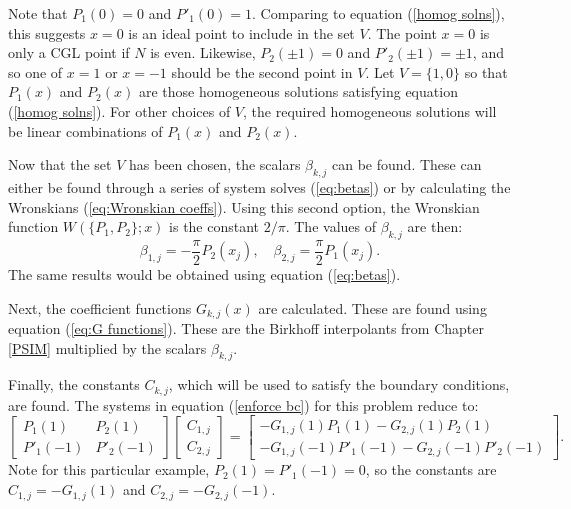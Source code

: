 \documentclass{sfuthesis}
\begin{document}
Note that $P_1(0) = 0$ and $P'_1(0) = 1$.
Comparing to equation (\ref{homog solns}), this suggests $x = 0$ is an ideal point to include in the set $V$.
The point $x=0$ is only a CGL point if $N$ is even.
Likewise, $P_2(\pm 1) = 0$ and $P'_2(\pm 1) = \pm 1$, and so one of $x=1$ or $x=-1$ should be the second point in $V$.
Let $V = \{ 1, 0 \}$ so that $P_1(x)$ and $P_2(x)$ are those homogeneous solutions satisfying equation (\ref{homog solns}).
For other choices of $V$, the required homogeneous solutions will be linear combinations of $P_1(x)$ and $P_2(x)$.

Now that the set $V$ has been chosen, the scalars $\beta_{k,j}$ can be found.
These can either be found through a series of system solves (\ref{eq:betas}) or by calculating the Wronskians (\ref{eq:Wronskian coeffs}).
Using this second option, the Wronskian function $W(\{ P_1, P_2 \}; x)$ is the constant $2/\pi$.
The values of $\beta_{k,j}$ are then:
\begin{equation}
\beta_{1,j} = -\frac{\pi}{2} P_2(x_j), \quad \beta_{2,j} = \frac{\pi}{2} P_1(x_j) .
\end{equation}
The same results would be obtained using equation (\ref{eq:betas}).

Next, the coefficient functions $G_{k,j}(x)$ are calculated.
These are found using equation (\ref{eq:G functions}).
These are the Birkhoff interpolants from Chapter \ref{PSIM} multiplied by the scalars $\beta_{k,j}$.

Finally, the constants $C_{k,j}$, which will be used to satisfy the boundary conditions, are found.
The systems in equation (\ref{enforce bc}) for this problem reduce to:
\begin{equation}
\begin{bmatrix} P_1(1) & P_2(1) \\ P'_1(-1) & P'_2(-1) \end{bmatrix}
\begin{bmatrix} C_{1,j} \\ C_{2,j} \end{bmatrix} =
\begin{bmatrix}  -G_{1,j}(1) P_1(1) - G_{2,j}(1) P_2(1) \\ -G_{1,j}(-1) P'_1(-1) - G_{2,j}(-1) P'_2(-1) \end{bmatrix} .
\end{equation}
Note for this particular example, $P_2(1) = P'_1(-1) = 0$, so the constants are
$C_{1,j} = -G_{1,j}(1)$ and $C_{2,j} = -G_{2,j}(-1)$.
\end{document}
